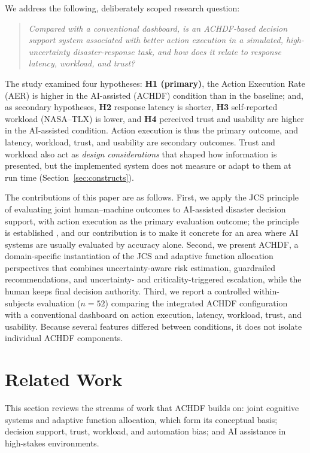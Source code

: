 \documentclass[journal]{IEEEtran}
\theoremstyle{plain}
\theoremstyle{definition}
\begin{document}
We address the following, deliberately scoped research question:
\begin{quote}
    \emph{Compared with a conventional dashboard, is an ACHDF-based decision support system associated with better action execution in a simulated, high-uncertainty disaster-response task, and how does it relate to response latency, workload, and trust?}
\end{quote}
The study examined four hypotheses: \textbf{H1 (primary)}, the Action Execution Rate (AER) is higher in the AI-assisted (ACHDF) condition than in the baseline; and, as secondary hypotheses, \textbf{H2} response latency is shorter, \textbf{H3} self-reported workload (NASA--TLX) is lower, and \textbf{H4} perceived trust and usability are higher in the AI-assisted condition. Action execution is thus the primary outcome, and latency, workload, trust, and usability are secondary outcomes. Trust and workload also act as \emph{design considerations} that shaped how information is presented, but the implemented system does not measure or adapt to them at run time (Section~\ref{sec:constructs}).

The contributions of this paper are as follows. First, we apply the JCS principle of evaluating joint human--machine outcomes to AI-assisted disaster decision support, with action execution as the primary evaluation outcome; the principle is established \cite{Hollnagel2005JCS,Woods2006JCS}, and our contribution is to make it concrete for an area where AI systems are usually evaluated by accuracy alone. Second, we present ACHDF, a domain-specific instantiation of the JCS and adaptive function allocation perspectives that combines uncertainty-aware risk estimation, guardrailed recommendations, and uncertainty- and criticality-triggered escalation, while the human keeps final decision authority. Third, we report a controlled within-subjects evaluation ($n=52$) comparing the integrated ACHDF configuration with a conventional dashboard on action execution, latency, workload, trust, and usability. Because several features differed between conditions, it does not isolate individual ACHDF components.


\section{Related Work}
This section reviews the streams of work that ACHDF builds on: joint cognitive systems and adaptive function allocation, which form its conceptual basis; decision support, trust, workload, and automation bias; and AI assistance in high-stakes environments.
\end{document}
